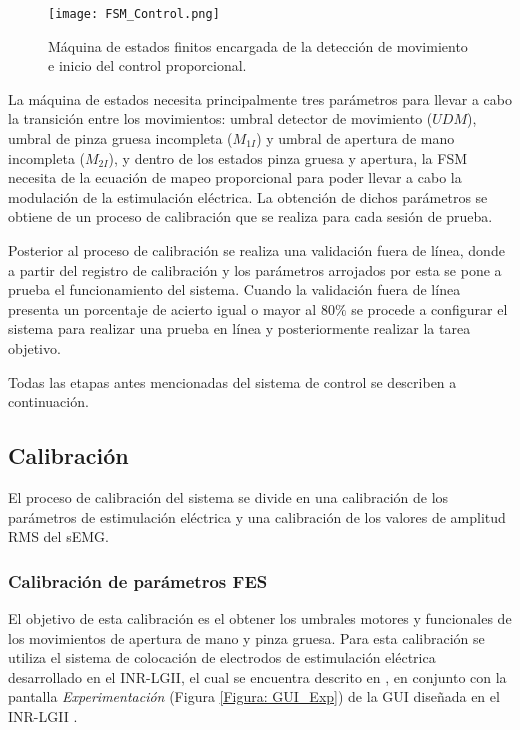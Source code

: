 
\begin{figure}[htbp]
	\centering
	\texttt{[image: FSM\_Control.png]}
	\caption[FSM para control]{Máquina de estados finitos encargada de la detección de movimiento e inicio del control proporcional.}
	\label{Figura: FSM_Control}
\end{figure}

La máquina de estados necesita principalmente tres parámetros para llevar a cabo la transición entre los movimientos: umbral detector de movimiento ($UDM$), umbral de pinza gruesa incompleta ($M_{1I}$) y umbral de apertura de mano incompleta ($M_{2I}$), y dentro de los estados pinza gruesa y apertura, la FSM necesita de la ecuación de mapeo proporcional para poder llevar a cabo la modulación de la estimulación eléctrica. La obtención de dichos parámetros se obtiene de un proceso de calibración que se realiza para cada sesión de prueba.

Posterior al proceso de calibración se realiza una validación fuera de línea, donde a partir del registro de calibración y los parámetros arrojados por esta se pone a prueba el funcionamiento del sistema. Cuando la validación fuera de línea presenta un porcentaje de acierto igual o mayor al 80$\%$ se procede a configurar el sistema para realizar una prueba en línea y posteriormente realizar la tarea objetivo.

Todas las etapas antes mencionadas del sistema de control se describen a continuación.

\subsection{Calibración}
El proceso de calibración del sistema se divide en una calibración de los parámetros de estimulación eléctrica y una calibración de los valores de amplitud RMS del sEMG.

\subsubsection{Calibración de parámetros FES}
El objetivo de esta calibración es el obtener los umbrales motores y funcionales de los movimientos de apertura de mano y pinza gruesa. Para esta calibración se utiliza el sistema de colocación de electrodos de estimulación eléctrica desarrollado en el INR-LGII, el cual se encuentra descrito en \cite{AnaMartin2019}, en conjunto con la pantalla \emph{Experimentación} (Figura \ref{Figura: GUI_Exp}) de la GUI diseñada en el INR-LGII \cite{JanethFuentes2018}.

